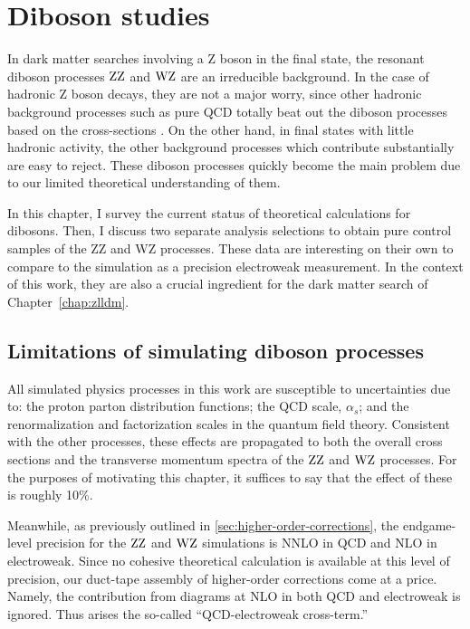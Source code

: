 \chapter{Diboson studies}
\label{chap:dibosons}

In dark matter searches involving a Z boson in the final state, 
the resonant diboson processes $\mathrm{Z}\mathrm{Z}$ and $\mathrm{W}\mathrm{Z}$ are an irreducible background.
In the case of hadronic Z boson decays, they are not a major worry, since
other hadronic background processes such as pure QCD totally beat out the
diboson processes based on the cross-sections \cite{Sirunyan:2017jix}.
On the other hand, in final states with little hadronic activity,
the other background processes which contribute substantially are easy to reject.
These diboson processes quickly become the main problem due to our limited theoretical understanding of them.

In this chapter, I survey the current status of theoretical calculations for dibosons. 
Then, I discuss two separate analysis selections to obtain pure control samples 
of the ZZ and WZ processes.
These data are interesting on their own to compare to the simulation as a precision electroweak measurement.
In the context of this work, they are also a crucial ingredient
for the dark matter search of Chapter~\ref{chap:zlldm}.

\section{Limitations of simulating diboson processes}
\label{sec:vvtheo}
All simulated physics processes in this work are susceptible to uncertainties due to: the proton parton distribution functions; the QCD scale, $\alpha_s$; and the renormalization and factorization scales in the quantum field theory.
Consistent with the other processes, these effects are propagated to both the overall cross sections and the transverse momentum spectra of the $\mathrm{Z}\mathrm{Z}$ and $\mathrm{W}\mathrm{Z}$ processes.
For the purposes of motivating this chapter, it suffices to say that the effect of these is roughly 10\%. 

Meanwhile, as previously outlined in \ref{sec:higher-order-corrections}, the endgame-level precision for the $\mathrm{Z}\mathrm{Z}$ and $\mathrm{W}\mathrm{Z}$ simulations is NNLO in QCD and NLO in electroweak.
Since no cohesive theoretical calculation is available at this level of precision, our duct-tape assembly of higher-order corrections come at a price.
Namely, the contribution from diagrams at NLO in both QCD and electroweak is ignored. Thus arises the so-called ``QCD-electroweak cross-term.''

